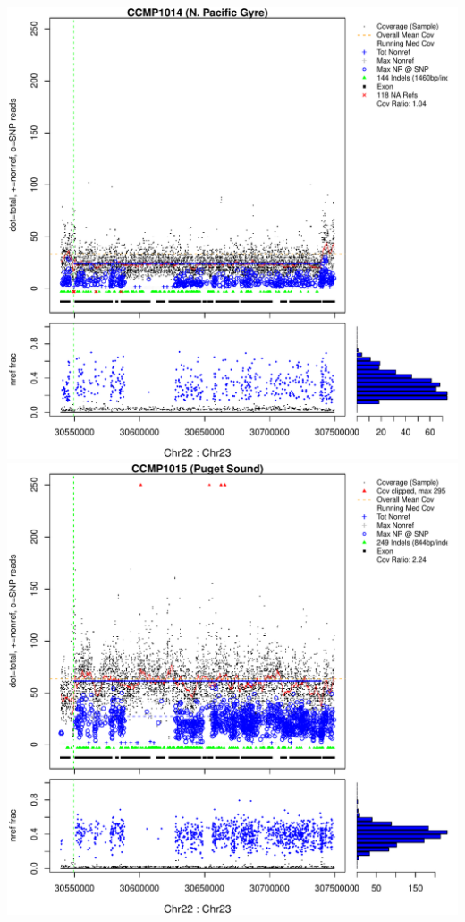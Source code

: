 \documentclass{article}\usepackage[]{graphicx}\usepackage[]{color}
\makeatletter
\def\maxwidth{ %
  \ifdim\Gin@nat@width>\linewidth
    \linewidth
  \else
    \Gin@nat@width
  \fi
}
\newenvironment{knitrout}{}{} %
\makeatother
\begin{document}
\begin{knitrout}
{\includegraphics[width=\maxwidth]{figs-knitr/unnamed-chunk-41-5} 
\includegraphics[width=\maxwidth]{figs-knitr/unnamed-chunk-41-6} 
}
\end{knitrout}
\end{document}
